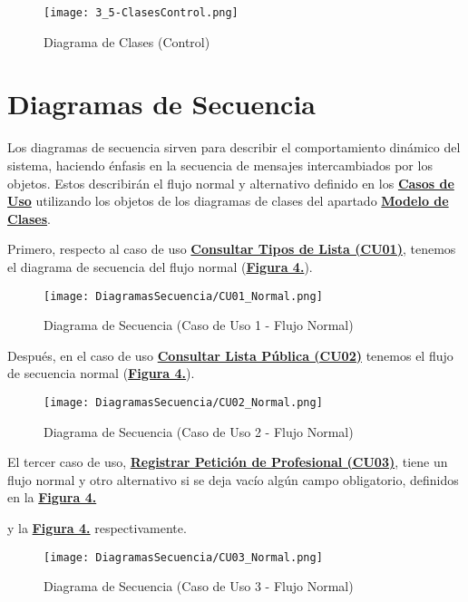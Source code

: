 \begin{landscape}
  \begin{figure}[!htbp]
    \centering
    \texttt{[image: 3\_5-ClasesControl.png]}
    \caption{Diagrama de Clases (Control)}
    \label{fig:ClasesControl}
  \end{figure}
\end{landscape}
\FloatBarrier

\pagebreak
\section{Diagramas de Secuencia}
Los diagramas de secuencia sirven para describir el comportamiento dinámico del sistema, haciendo énfasis en la secuencia de mensajes intercambiados por los objetos. Estos describirán el flujo normal y alternativo definido en los \textbf{\hyperref[cu]{Casos de Uso}} utilizando los objetos de los diagramas de clases del apartado \textbf{\hyperref[mc]{Modelo de Clases}}. \\


\addtocounter{figura_cap4}{1}
Primero, respecto al caso de uso \textbf{\hyperref[tab:cuuConsultaTiposLst]{Consultar Tipos de Lista (CU01)}}, tenemos el diagrama de secuencia del flujo normal (\textbf{\hyperref[fig:Secuencia_CU1_Normal]{Figura 4.}}).
\begin{figure}[!htbp]
  \centering
  \texttt{[image: DiagramasSecuencia/CU01\_Normal.png]}
  \caption{Diagrama de Secuencia (Caso de Uso 1 - Flujo Normal)}
  \label{fig:Secuencia_CU1_Normal}
\end{figure}
\FloatBarrier

\addtocounter{figura_cap4}{1}
Después, en el caso de uso \textbf{\hyperref[tab:cuuConsultaLstPub]{Consultar Lista Pública (CU02)}} tenemos el flujo de secuencia normal (\textbf{\hyperref[fig:Secuencia_CU2_Normal]{Figura 4.}}).
\begin{landscape}
  \begin{figure}[!htbp]
    \centering
    \texttt{[image: DiagramasSecuencia/CU02\_Normal.png]}
    \caption{Diagrama de Secuencia (Caso de Uso 2 - Flujo Normal)}
    \label{fig:Secuencia_CU2_Normal}
  \end{figure}
\end{landscape}
\FloatBarrier

\addtocounter{figura_cap4}{1}
El tercer caso de uso, \textbf{\hyperref[tab:cuuRegPeticProf]{Registrar Petición de Profesional (CU03)}}, tiene un flujo normal y otro alternativo si se deja vacío algún campo obligatorio, definidos en la \textbf{\hyperref[fig:Secuencia_CU3_Normal]{Figura 4.}}\addtocounter{figura_cap4}{1} y la \textbf{\hyperref[fig:Secuencia_CU3_Alt1]{Figura 4.}} respectivamente.
\begin{figure}[!htbp]
  \centering
  \texttt{[image: DiagramasSecuencia/CU03\_Normal.png]}
  \caption{Diagrama de Secuencia (Caso de Uso 3 - Flujo Normal)}
  \label{fig:Secuencia_CU3_Normal}
\end{figure}
\FloatBarrier

